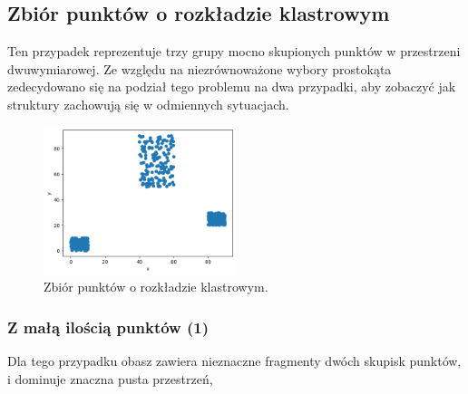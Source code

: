 \documentclass{lab}
\begin{document}
\newpage
\subsection{Zbiór punktów o rozkładzie klastrowym}
Ten przypadek reprezentuje trzy grupy mocno skupionych punktów w przestrzeni dwuwymiarowej.
Ze względu na niezrównoważone wybory prostokąta zedecydowano się na podział tego problemu na dwa przypadki, aby zobaczyć jak struktury zachowują się w odmiennych sytuacjach.

\begin{figure}[H]
  \centering
  \includegraphics[width=0.5\textwidth]{resources/cluster.png}
  \caption{Zbiór punktów o rozkładzie klastrowym.}
  \label{fig:cluster}
\end{figure}

\subsubsection{Z małą ilością punktów (1)}
Dla tego przypadku obasz zawiera nieznaczne fragmenty dwóch skupisk punktów, i dominuje znaczna pusta przestrzeń,
\end{document}
